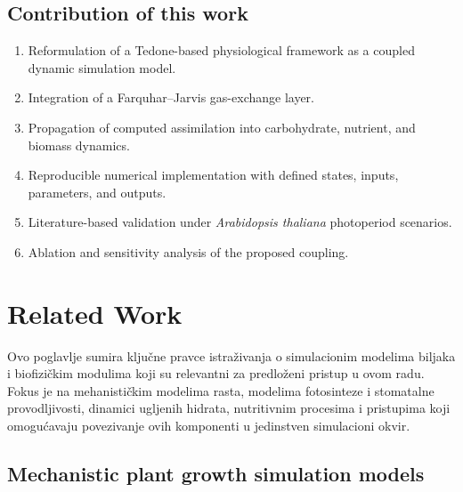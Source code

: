 \documentclass[a4paper,fleqn]{cas-dc}
\begin{document}
\subsection{Contribution of this work}

\begin{enumerate}
    \item Reformulation of a Tedone-based physiological framework as a coupled dynamic simulation model.
    \item Integration of a Farquhar--Jarvis gas-exchange layer.
    \item Propagation of computed assimilation into carbohydrate, nutrient, and biomass dynamics.
    \item Reproducible numerical implementation with defined states, inputs, parameters, and outputs.
    \item Literature-based validation under \textit{Arabidopsis thaliana} photoperiod scenarios.
    \item Ablation and sensitivity analysis of the proposed coupling.
\end{enumerate}

\section{Related Work}
\label{sec:related_work}
Ovo poglavlje sumira ključne pravce istraživanja o simulacionim modelima biljaka i biofizičkim modulima koji su relevantni za predloženi pristup u ovom radu. Fokus je na mehanističkim modelima rasta, modelima fotosinteze i stomatalne provodljivosti, dinamici ugljenih hidrata, nutritivnim procesima i pristupima koji omogućavaju povezivanje ovih komponenti u jedinstven simulacioni okvir.

\subsection{Mechanistic plant growth simulation models}
\end{document}
